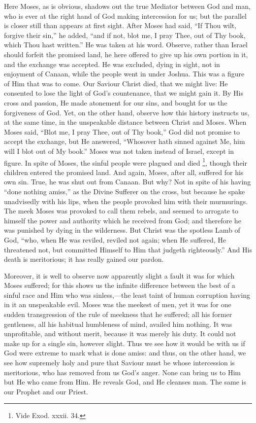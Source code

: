 Here Moses, as is obvious, shadows out the true Mediator between
God and man, who is ever at the right hand of God making intercession
for us; but the parallel is closer still than appears at first sight.
After Moses had said, ``If Thou wilt, forgive their sin,'' he
added, ``and if not, blot me, I pray Thee, out of Thy book, which
Thou hast written.'' He was taken at his word. Observe, rather
than Israel should forfeit the promised land, he here offered to give
up his own portion in it, and the exchange was accepted. He was
excluded, dying in sight, not in enjoyment of Canaan, while the people
went in under Joshua. This was a figure of Him that was to come. Our
Saviour Christ died, that we might live: He consented to lose the
light of God's countenance, that we might gain it. By His cross and
passion, He made atonement for our sins, and bought for us the
forgiveness of God. Yet, on the other hand, observe how this history
instructs us, at the same time, in the unspeakable distance between
Christ and Moses. When Moses said, ``Blot me, I pray Thee, out of
Thy book,'' God did not promise to accept the exchange, but He
answered, ``Whosover hath sinned against Me, him will I blot out
of My book.'' Moses was not taken instead of Israel, except in
figure. In spite of Moses, the sinful people were plagued and died \footnote{Vide Exod. xxxii. 34.}, though their children entered the promised land. And again,
Moses, after all, suffered for his own sin. True, he was shut out from
Canaan. But why? Not in spite of his having ``done nothing
amiss,'' as the Divine Sufferer on the cross, but because he spake
unadvisedly with his lips, when the people provoked him with their
murmurings. The meek Moses was provoked to call them rebels, and
seemed to arrogate to himself the power and authority which he
received from God; and therefore he was punished by dying in the
wilderness. But Christ was the spotless Lamb of God, ``who, when
He was reviled, reviled not again; when He suffered, He threatened
not, but committed Himself to Him that judgeth righteously.'' And
His death is meritorious; it has really gained our pardon.

Moreover, it is well to observe now apparently slight a fault it
was for which Moses suffered; for this shows us the infinite
difference between the best of a sinful race and Him who was sinless,—the
least taint of human corruption having in it an unspeakable evil.
Moses was the meekest of men, yet it was for one sudden transgression
of the rule of meekness that he suffered; all his former gentleness,
all his habitual humbleness of mind, availed him nothing. It was
unprofitable, and without merit, because it was merely his duty. It
could not make up for a single sin, however slight. Thus we see how it
would be with us if God were extreme to mark what is done amiss: and
thus, on the other hand, we see how supremely holy and pure that
Saviour must be whose intercession is meritorious, who has removed
from us God's anger. None can bring us to Him but He who came from
Him. He reveals God, and He cleanses man. The same is our Prophet and
our Priest.

